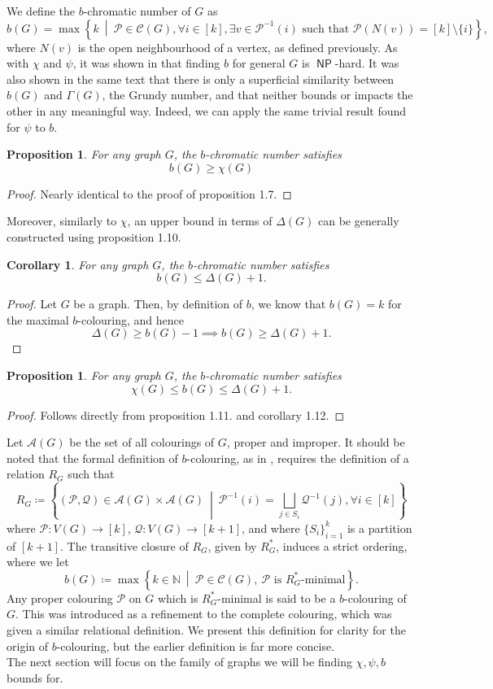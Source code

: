 \documentclass[12pt]{amsart}
\newcommand{\afunc}[1]{\operatorname{\mathsf{#1}}}
\numberwithin{figure}{section}
\theoremstyle{plain}
\newtheorem{proposition}[theorem]{Proposition}
\newtheorem{corollary}[theorem]{Corollary}
\begin{document}
\indent We define the $b$-chromatic number of $G$ as
\[b(G) = \max\left\{k\:\middle|\:\mathcal{P}\in\mathscr{C}(G), \forall i\in[k], \exists v\in\mathcal{P}^{-1}(i) \text{ such that } \mathcal{P}(N(v)) = [k]\setminus\{i\}\right\},\]
where $N(v)$ is the open neighbourhood of a vertex, as defined previously. As with $\chi$ and $\psi$, it was shown in \cite{IrvMan99} that finding $b$ for general $G$ is $\afunc{NP}$-hard. It was also shown in the same text that there is only a superficial similarity between $b(G)$ and $\Gamma(G)$, the Grundy number, and that neither bounds or impacts the other in any meaningful way. Indeed, we can apply the same trivial result found for $\psi$ to $b$.
\begin{proposition}
    For any graph $G$, the $b$-chromatic number satisfies
    \[b(G) \geq \chi(G)\]
\end{proposition}
\begin{proof}
    Nearly identical to the proof of proposition 1.7.
\end{proof}
\indent Moreover, similarly to $\chi$, an upper bound in terms of $\Delta(G)$ can be generally constructed using proposition 1.10.
\begin{corollary}
    For any graph $G$, the $b$-chromatic number satisfies
    \[b(G) \leq \Delta(G) + 1.\]
\end{corollary}
\begin{proof}
    Let $G$ be a graph. Then, by definition of $b$, we know that $b(G) = k$ for the maximal $b$-colouring, and hence
    \[\Delta(G) \geq b(G) - 1 \implies b(G)\geq\Delta(G) + 1.\]
\end{proof}
\begin{proposition}
    For any graph $G$, the $b$-chromatic number satisfies
    \[\chi(G) \leq b(G) \leq \Delta(G) + 1.\]
\end{proposition}
\begin{proof}
    Follows directly from proposition 1.11. and corollary 1.12.
\end{proof}
\indent Let $\mathscr{A}(G)$ be the set of all colourings of $G$, proper and improper. It should be noted that the formal definition of $b$-colouring, as in \cite{IrvMan99}, requires the definition of a relation $R_{G}$ such that
\[R_{G} \coloneq \left\{(\mathcal{P},\mathcal{Q}) \in \mathscr{A}(G)\times\mathscr{A}(G)\:\middle|\:\mathcal{P}^{-1}(i) = \textstyle\bigsqcup_{j\in S_{i}}\mathcal{Q}^{-1}(j), \forall i\in [k]\right\}\]
where $\mathcal{P}:V(G) \to [k]$, $\mathcal{Q}:V(G)\to[k+1]$, and where $\{S_{i}\}_{i=1}^{k}$ is a partition of $[k+1]$. The transitive closure of $R_{G}$, given by $R_{G}^{*}$, induces a strict ordering, where we let
\[b(G) \coloneq \max \left\{ k \in\mathbb{N} \:\middle|\:\mathcal{P} \in \mathscr{C}(G),\: \mathcal{P} \text{ is } R_G^*\text{-minimal} \right\}.\]
Any proper colouring $\mathcal{P}$ on $G$ which is $R_{G}^{*}$-minimal is said to be a $b$-colouring of $G$. This was introduced as a refinement to the complete colouring, which was given a similar relational definition. We present this definition for clarity for the origin of $b$-colouring, but the earlier definition is far more concise.\\
\indent The next section will focus on the family of graphs we will be finding $\chi, \psi, b$ bounds for.
\end{document}
